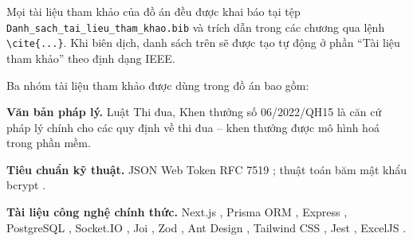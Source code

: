 \documentclass[../DoAn.tex]{subfiles}
\begin{document}
Mọi tài liệu tham khảo của đồ án đều được khai báo tại tệp \texttt{Danh\_sach\_tai\_lieu\_tham\_khao.bib} và trích dẫn trong các chương qua lệnh \texttt{\textbackslash cite\{...\}}. Khi biên dịch, danh sách trên sẽ được tạo tự động ở phần ``Tài liệu tham khảo'' theo định dạng IEEE.

Ba nhóm tài liệu tham khảo được dùng trong đồ án bao gồm:

\textbf{Văn bản pháp lý.} Luật Thi đua, Khen thưởng số 06/2022/QH15 \cite{luat062022} là căn cứ pháp lý chính cho các quy định về thi đua -- khen thưởng được mô hình hoá trong phần mềm.

\textbf{Tiêu chuẩn kỹ thuật.} JSON Web Token RFC 7519 \cite{rfc7519}; thuật toán băm mật khẩu bcrypt \cite{bcrypt}.

\textbf{Tài liệu công nghệ chính thức.} Next.js \cite{nextjsdocs}, Prisma ORM \cite{prismadocs}, Express \cite{expressdocs}, PostgreSQL \cite{pgdocs}, Socket.IO \cite{socketiodocs}, Joi \cite{joidocs}, Zod \cite{zoddocs}, Ant Design \cite{antdesigndocs}, Tailwind CSS \cite{tailwinddocs}, Jest \cite{jestdocs}, ExcelJS \cite{exceljsdocs}.
\end{document}
